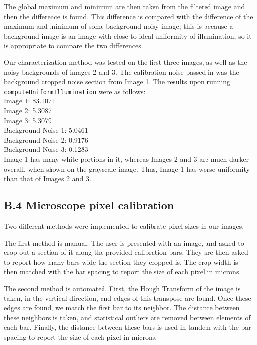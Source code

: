 \documentclass{article}
\begin{document}
The global maximum and minimum are then taken from the filtered image and then the difference is found.  This difference is compared with the difference of the maximum and minimum of some background noisy image; this is because a background image is an image with close-to-ideal uniformity of illumination, so it is appropriate to compare the two differences.

Our characterization method was tested on the first three images, as well as the noisy backgrounds of 
images 2 and 3. The calibration noise passed in was the background cropped noise section from
Image 1. The results upon running \texttt{computeUniformIllumination} were as follows:\\

Image 1: 83.1071\\
Image 2: 5.3087\\
Image 3: 5.3079\\
Background Noise 1: 5.0461\\
Background Noise 2: 0.9176\\
Background Noise 3: 0.1283\\

Image 1 has many white portions in it, whereas Images 2 and 3 are much darker overall, when shown
on the grayscale image. Thus, Image 1 has worse uniformity than that of Images 2 and 3.\\

\pagebreak
\subsection*{B.4 Microscope pixel calibration}
 
Two different methods were implemented to calibrate pixel sizes in our images.

The first method is manual. The user is presented with an image, and asked to crop out a section of it along the provided calibration bars. They are then asked to report how many bars wide the section they cropped is. The crop width is then matched with the bar spacing to report the size of each pixel in microns.

The second method is automated. First, the Hough Transform of the image is taken, in the vertical direction, and edges of this transpose are found. Once these edges are found, we match the first bar to its neighbor. The distance between these neighbors is taken, and statistical outliers are removed between elements of each bar. Finally, the distance between these bars is used in tandem with the bar spacing to report the size of each pixel in microns.
\end{document}
